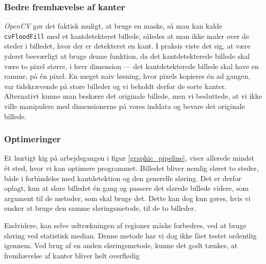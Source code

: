 {\subsubsection{Bedre fremhævelse af kanter}

\emph{OpenCV} gør det faktisk muligt, at bruge en maske, så man kan
kalde \texttt{cvFloodFill} med et kantdetekteret billede, således at man
ikke maler over de steder i billedet, hvor der er detekteret en kant. I
praksis viste det sig, at være yderst besværligt at bruge denne
funktion, da det kantdetekterede billede skal være to pixel større, i
hver dimension --- det kantdetekterede billede skal have en ramme, på én
pixel. En meget naiv løsning, hvor pixels kopieres én ad gangen, var
tidskrævende på store billeder og vi beholdt derfor de sorte kanter.
Alternativt kunne man beskære det originale billede, men vi besluttede,
at vi ikke ville manipulere med dimensionerne på vores inddata og bevare
det originale billede.

\subsubsection{Optimeringer}
Et hurtigt kig på arbejdsgangen i figur \ref{graphic_pipeline}, viser
allerede mindst ét sted, hvor vi kan optimere programmet. Billedet bliver
nemlig sløret to steder, både i forbindelse med kantdetektion og den
generelle sløring. Det er derfor oplagt, kun at sløre billedet én gang
og passere det slørede billede videre, som argument til de metoder, som
skal bruge det. Dette kan dog kun gøres, hvis vi ønsker at bruge den
samme sløringsmetode, til de to billeder.

Endvidere, kan selve udtrækningen af regioner måske forbedres, ved at bruge
sløring ved statistisk median. Denne metode har vi dog ikke fået testet
ordentlig igennem. Ved brug af en anden sløringsmetode, kunne det godt
tænkes, at fremhævelse af kanter bliver helt overflødig

}

